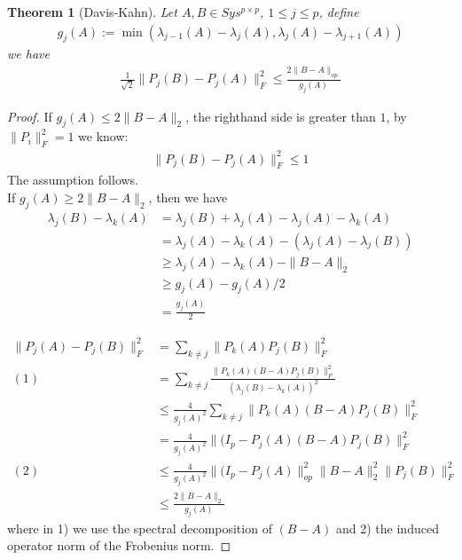 \documentclass[a4paper,12pt, oneside, fleqn]{book}
\newtheorem{theorem}{Theorem}[section]
\theoremstyle{definition}
\theoremstyle{remark}
\begin{document}
\begin{theorem}[Davis-Kahn]
Let $A, B \in Sys^{p \times p}$, $1 \le j \le p$, define
\begin{align*}
	g_j(A):= \min(\lambda_{j-1}(A) - \lambda_j(A), \lambda_j(A) - \lambda_{j+1}(A))
\end{align*}
we have
\begin{align*}
	\frac{1}{\sqrt{2}}\|P_j(B) - P_j(A)\|^2_F \le \frac{2\|B - A\|_{op}}{g_j(A)}
\end{align*}
\end{theorem}
\begin{proof}
If $g_j(A) \le 2\|B-A\|_2$, the righthand side is greater than $1$, by $\|P_i\|_F^2 = 1$ we know:
\begin{align*}
	\|P_j(B) - P_j(A)\|_F^2 \le 1
\end{align*}
The assumption follows. \\
If $g_j(A) \ge 2\|B-A\|_2$, then we have
\begin{align*}
	\lambda_j(B) - \lambda_k(A) &= \lambda_j(B) + \lambda_j(A) - \lambda_j(A) - \lambda_k(A)\\
	&=\lambda_j(A) - \lambda_k(A)  -(\lambda_j(A) - \lambda_j(B))\\
	&\ge \lambda_j(A) -\lambda_k(A) - \|B - A\|_2\\
	&\ge g_j(A) - g_j(A) \slash 2 \\
	&= \frac{g_j(A)}{2}
\end{align*}

\begin{align*}
	\|P_j(A) - P_j(B)\|_F^2 &= \sum_{k \neq j} \|P_k(A)P_j(B)\|_F^2\\
	(1)&= \sum_{k \neq j}\frac{\|P_k(A)(B - A)P_j(B)\|_F^2}{(\lambda_j(B) - \lambda_k(A))^2}\\
	&\le \frac{4}{g_j(A)^2}\sum_{k \neq j}\|P_k(A)(B - A)P_j(B)\|_F^2\\
	&= \frac{4}{g_j(A)^2}\|(I_p - P_j(A) (B - A)P_j(B) \|_F^2\\
	(2)&\le \frac{4}{g_j(A)^2}\|(I_p - P_j(A)\|_{op}^2 \|B - A\|_2^2\|P_j(B)\|_F^2\\
	&\le \frac{2\|B - A\|_2}{g_j(A)} 
\end{align*}
	where in 1) we use the spectral decomposition of $(B - A)$ and 2) the induced operator norm of the Frobenius norm.
\end{proof}
\end{document}
